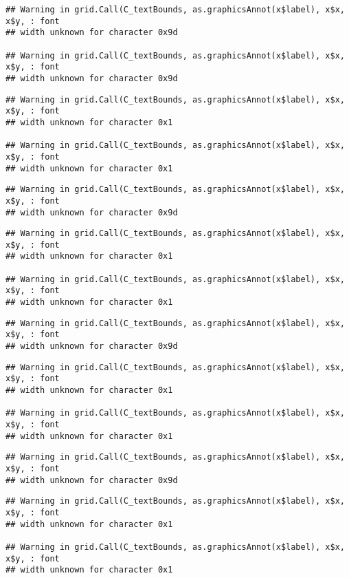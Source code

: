 \documentclass[
]{article}
\begin{document}
\begin{verbatim}
## Warning in grid.Call(C_textBounds, as.graphicsAnnot(x$label), x$x, x$y, : font
## width unknown for character 0x9d

## Warning in grid.Call(C_textBounds, as.graphicsAnnot(x$label), x$x, x$y, : font
## width unknown for character 0x9d
\end{verbatim}

\begin{verbatim}
## Warning in grid.Call(C_textBounds, as.graphicsAnnot(x$label), x$x, x$y, : font
## width unknown for character 0x1

## Warning in grid.Call(C_textBounds, as.graphicsAnnot(x$label), x$x, x$y, : font
## width unknown for character 0x1
\end{verbatim}

\begin{verbatim}
## Warning in grid.Call(C_textBounds, as.graphicsAnnot(x$label), x$x, x$y, : font
## width unknown for character 0x9d
\end{verbatim}

\begin{verbatim}
## Warning in grid.Call(C_textBounds, as.graphicsAnnot(x$label), x$x, x$y, : font
## width unknown for character 0x1

## Warning in grid.Call(C_textBounds, as.graphicsAnnot(x$label), x$x, x$y, : font
## width unknown for character 0x1
\end{verbatim}

\begin{verbatim}
## Warning in grid.Call(C_textBounds, as.graphicsAnnot(x$label), x$x, x$y, : font
## width unknown for character 0x9d
\end{verbatim}

\begin{verbatim}
## Warning in grid.Call(C_textBounds, as.graphicsAnnot(x$label), x$x, x$y, : font
## width unknown for character 0x1

## Warning in grid.Call(C_textBounds, as.graphicsAnnot(x$label), x$x, x$y, : font
## width unknown for character 0x1
\end{verbatim}

\begin{verbatim}
## Warning in grid.Call(C_textBounds, as.graphicsAnnot(x$label), x$x, x$y, : font
## width unknown for character 0x9d
\end{verbatim}

\begin{verbatim}
## Warning in grid.Call(C_textBounds, as.graphicsAnnot(x$label), x$x, x$y, : font
## width unknown for character 0x1

## Warning in grid.Call(C_textBounds, as.graphicsAnnot(x$label), x$x, x$y, : font
## width unknown for character 0x1
\end{verbatim}
\end{document}
